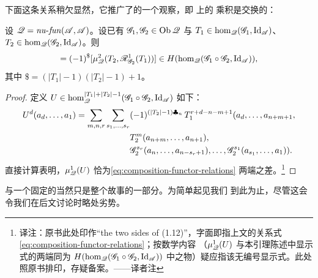 下面这条关系稍欠显然，它推广了\trGerstenhaber{}的一个观察，即\trHochschildCohomology{}%
上的 \trYoneda{}乘积是\trGraded{}交换的：
\begin{lemma}\label{thm:left-right-composition}
设 $\mathscr{Q}=\mathit{nu}\text{-}\mathit{fun}(\mathscr{A},\mathscr{A})$。设已有\trFunctor{}%
$\mathscr{G}_1,\mathscr{G}_2\in\operatorname{Ob}\mathscr{Q}$ 与\trNaturalTransformation{}%
$T_1\in\hom_{\mathscr{Q}}(\mathscr{G}_1,\mathrm{Id}_{\mathscr{A}})$、
$T_2\in\hom_{\mathscr{Q}}(\mathscr{G}_2,\mathrm{Id}_{\mathscr{A}})$。则
\begin{equation*}
[\mu^2_{\scr{Q}}(T_1,\scr{L}^1_{\scr{G}_1}(T_2))]
=(-1)^{\$}[\mu^2_{\scr{Q}}(T_2,\scr{R}^1_{\scr{G}_2}(T_1))]
\in H(\hom_{\scr{Q}}(\scr{G}_1\circ\scr{G}_2,\mathrm{Id}_{\scr{A}})),
\end{equation*}
其中 $\$=(|T_1|-1)(|T_2|-1)+1$。
\end{lemma}
\begin{proof}
定义
$U\in\hom^{|T_1|+|T_2|-1}_{\mathscr{Q}}(\mathscr{G}_1\circ\mathscr{G}_2,\mathrm{Id}_{\mathscr{A}})$
如下：
\begin{equation*}
\begin{split}
U^d(a_d,\ldots,a_1)
=\sum_{m,n,r}\sum_{s_1,\ldots,s_r}&(-1)^{(|T_2|-1)\clubsuit_n}\,
T_1^{r+d-n-m+1}(a_d,\ldots,a_{n+m+1},\\
& T_2^m(a_{n+m},\ldots,a_{n+1}),\\
& \mathscr{G}_2^{s_r}(a_n,\ldots,a_{n-s_r+1}),\ldots,
\mathscr{G}_2^{s_1}(a_{s_1},\ldots,a_1)).
\end{split}
\end{equation*}
直接计算表明，$\mu^1_{\mathscr{Q}}(U)$ 恰为\eqref{eq:composition-functor-relations}
两端之差。\footnote{译注：原书此处印作“the two sides of (1.12)”，字面即指上文的\trComposition\trFunctor{}关系式\eqref{eq:composition-functor-relations}；按数学内容
（$\mu^1_{\mathscr{Q}}(U)$ 与本引理陈述中显示式的两端同为
$H(\hom_{\mathscr{Q}}(\mathscr{G}_1\circ\mathscr{G}_2,\mathrm{Id}_{\mathscr{A}}))$
中之物）疑应指该无编号显示式。此处照原书排印，存疑备案。——译者注}
\end{proof}
\begin{remark}\label{thm:composition-only-part}
与一个固定\trFunctor{}的\trComposition{}当然只是整个故事的一部分。为简单起见我们
到此为止，尽管这会令我们在后文讨论\trQuasiequivalence{}时略处劣势。
\end{remark}
